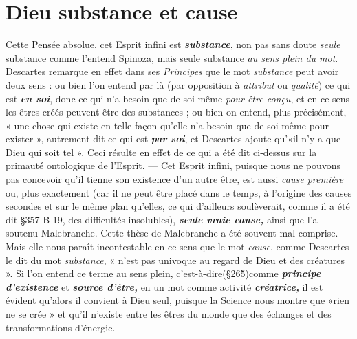 \section{Dieu substance et cause}%
Cette Pensée absolue, cet
Esprit infini est \textbf{\textit {substance}}, non pas sans doute {\it seule} substance comme
l'entend Spinoza, mais seule substance {\it au sens plein du mot}. Descartes
remarque en effet dans ses {\it Principes} que le mot {\it substance} peut
avoir deux sens : ou bien l’on entend par là (par opposition à {\it attribut}
ou {\it qualité}) ce qui est \textbf{\textit {en soi}}, donc ce qui n’a besoin que de soi-même
{\it pour être conçu}, et en ce sens les êtres créés peuvent être
des substances ; ou bien on entend, plus précisément, « une chose
qui existe en telle façon qu’elle n’a besoin que de soi-même pour
exister », autrement dit ce qui est \textbf{\textit {par soi}}, et Descartes ajoute qu’«il
n’y a que Dieu qui soit tel ». Ceci résulte en effet de ce qui a été dit
ci-dessus sur la primauté ontologique de l'Esprit. — Cet Esprit infini,
puisque nous ne pouvons pas concevoir qu’il tienne son existence
d’un autre être, est aussi {\it cause première} ou, plus exactement (car il
ne peut être placé dans le temps, à l’origine des causes secondes et
sur le même plan qu’elles, ce qui d’ailleurs soulèverait, comme il a
été dit \S 357 B 19, des difficultés insolubles), \textbf{\textit {seule vraie cause,}} ainsi
que l’a soutenu Malebranche. Cette thèse de Malebranche a été
souvent mal comprise. Mais elle nous paraît incontestable en ce sens
que le mot {\it cause}, comme Descartes le dit du mot {\it substance}, « n’est
pas univoque au regard de Dieu et des créatures ». Si l’on entend ce
terme au sens plein, c’est-à-dire(\S 265)comme \textbf{\textit {principe d'existence}} et
\textbf{\textit {source d’être,}} en un mot comme activité \textbf{\textit {créatrice,}} il est évident
qu’alors il convient à Dieu seul, puisque la Science nous montre que
«rien ne se crée » et qu’il n’existe entre les êtres du monde que des
échanges et des transformations d'énergie.

